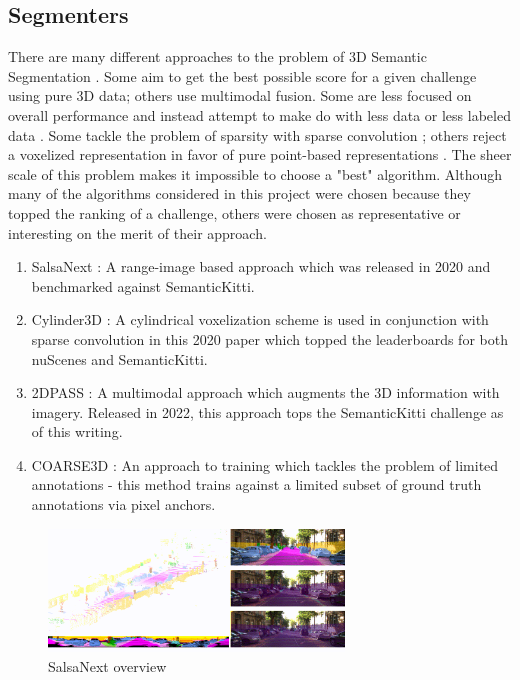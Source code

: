 \subsection{Segmenters}
\label{chap:segmenters}

There are many different approaches to the problem of 3D Semantic Segmentation \cite{deeplearningpcsurvey}. Some aim to get the best possible score for a given challenge using pure 3D data; others use multimodal fusion. Some are less focused on overall performance and instead attempt to make do with less data or less labeled data \cite{2dpass}. Some tackle the problem of sparsity with sparse convolution \cite{sparseconv}; others reject a voxelized representation in favor of pure point-based representations \cite{pointnet}. The sheer scale of this problem makes it impossible to choose a "best" algorithm. Although many of the algorithms considered in this project were chosen because they topped the ranking of a challenge, others were chosen as representative or interesting on the merit of their approach.

\begin{enumerate}
  \item SalsaNext \cite{salsanext}: A range-image based approach which was released in 2020 and benchmarked against SemanticKitti.
  \item Cylinder3D \cite{cylinder3d}: A cylindrical voxelization scheme is used in conjunction with sparse convolution in this 2020 paper which topped the leaderboards for both nuScenes and SemanticKitti.
  \item 2DPASS \cite{2dpass}: A multimodal approach which augments the 3D information with imagery. Released in 2022, this approach tops the SemanticKitti challenge as of this writing.
  \item COARSE3D \cite{coarse3d}: An approach to training which tackles the problem of limited annotations - this method trains against a limited subset of ground truth annotations via pixel anchors.
\end{enumerate}


\begin{figure}[htp]
  \centering
  \includegraphics[width=0.7\textwidth]{images/salsanext_overview.png}
  \caption{SalsaNext overview}
  \label{fig:salsanext-overview}
\end{figure}

